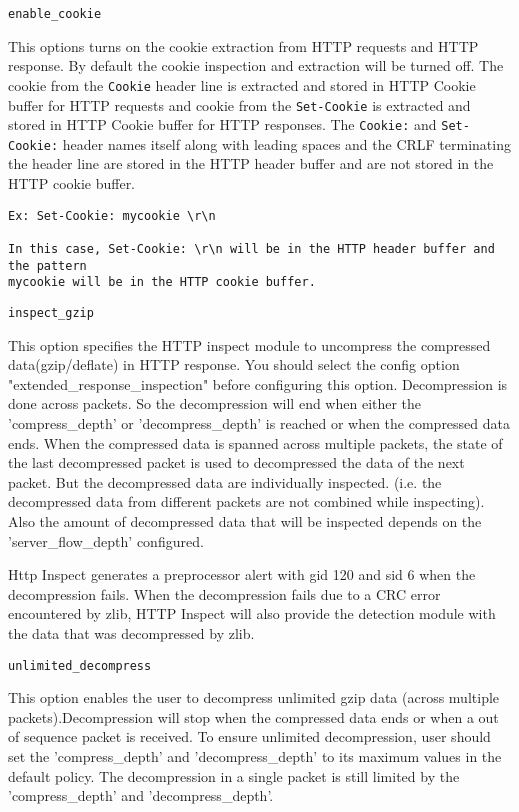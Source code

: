 \documentclass[english]{report}
\newcounter{slistnum}
\newenvironment{slist}
{ \begin{list}{ {\bf \arabic{slistnum}.} }{\usecounter{slistnum} } }
{ \end{list} }
\newenvironment{note}{
\samepage
    \vspace{10pt}{\textsf{
        {\hspace{7pt}\Huge{$\triangle$\hspace{-12.5pt}{\Large{$^!$}}}}\hspace{5pt}
        {\Large{NOTE}}
    }
    }
   \begin{center}
    \par\vspace{-17pt}

    \begin{lrbox}{\savepar}
    \begin{minipage}[r]{6in}
}
{
    \end{minipage}
    \end{lrbox}
    \fbox{
        \usebox{
            \savepar
	}
    }
    \par\vskip10pt
    \end{center}
}
\newenvironment{note}{
        \begin{rawhtml}
        <p><table border="1"><tr><td><b>
        Note:&nbsp;&nbsp;</b>
        \end{rawhtml}
}{
        \begin{rawhtml}
        </b></td></tr></table></p>
        \end{rawhtml}
}
\begin{document}
\begin{slist}
\begin{note}
\end{note}

\item \texttt{enable\_cookie}

This options turns on the cookie extraction from HTTP requests and HTTP response.
By default the cookie inspection and extraction will be turned off. The cookie from 
the \texttt{Cookie} header line is extracted and stored in HTTP Cookie buffer for 
HTTP requests and cookie from the \texttt{Set-Cookie} is extracted and stored in 
HTTP Cookie buffer for HTTP responses. The \texttt{Cookie:} and \texttt{Set-Cookie:} 
header names itself along with leading spaces and the CRLF terminating the header 
line are stored in the HTTP header buffer and are not stored in the HTTP cookie buffer.

\begin{verbatim}
Ex: Set-Cookie: mycookie \r\n

In this case, Set-Cookie: \r\n will be in the HTTP header buffer and the pattern
mycookie will be in the HTTP cookie buffer.

\end{verbatim}

\item \texttt{inspect\_gzip}

This option specifies the HTTP inspect module to uncompress the compressed
data(gzip/deflate) in HTTP response. You should select the config option
"extended\_response\_inspection" before configuring this option.  Decompression 
is done across packets. So the decompression will end when either the 
'compress\_depth' or 'decompress\_depth' is reached or when the compressed data ends.
When the compressed data is spanned across multiple packets, the state of the last 
decompressed packet is used to decompressed the data of the next packet. 
But the decompressed data are individually inspected. (i.e. the 
decompressed data from different packets are not combined while inspecting). 
Also the amount of decompressed data that will be inspected depends on the 
'server\_flow\_depth' configured.

Http Inspect generates a preprocessor alert with gid 120 and sid 6 when the decompression
fails. When the decompression fails due to a CRC error encountered by zlib, HTTP Inspect
will also provide the detection module with the data that was decompressed by zlib.

\item \texttt{unlimited\_decompress}

This option enables the user to decompress unlimited gzip data (across multiple 
packets).Decompression will stop when the compressed data ends or when a out of 
sequence packet is received. To ensure unlimited decompression, user should set 
the 'compress\_depth' and 'decompress\_depth' to its maximum values in the default 
policy. The decompression in a single packet is still limited by the 'compress\_depth' 
and 'decompress\_depth'.


\end{slist}
\end{document}
